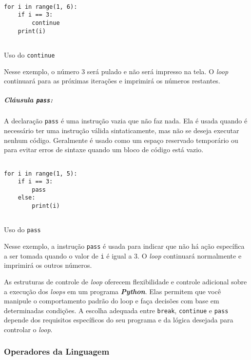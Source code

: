 \documentclass[a4paper, 12pt, onecolumn,singlespacing]{article}
\begin{document}
\begin{listing}[!ht]
	\begin{verbatim}
		
for i in range(1, 6):
	if i == 3:
		continue
	print(i)
	
	\end{verbatim}
	\label{clausula_continue}
	\caption{Uso do \texttt{continue}}
\end{listing}

Nesse exemplo, o número 3 será pulado e não será impresso na tela. O \textit{loop} continuará para as próximas iterações e imprimirá os números restantes.

	\subparagraph{Cláusula \texttt{pass}:}A declaração \texttt{pass} é uma instrução vazia que não faz nada. Ela é usada quando é necessário ter uma instrução válida sintaticamente, mas não se deseja executar nenhum código. Geralmente é usado como um espaço reservado temporário ou para evitar erros de sintaxe quando um bloco de código está vazio.
	
\begin{listing}[!ht]
	\begin{verbatim}
		
for i in range(1, 5):
	if i == 3:
		pass
	else:
		print(i)
	
	\end{verbatim}
	\label{clausula_pass}
	\caption{Uso do \texttt{pass}}
\end{listing}

Nesse exemplo, a instrução \texttt{pass} é usada para indicar que não há ação específica a ser tomada quando o valor de \texttt{i} é igual a 3. O \textit{loop} continuará normalmente e imprimirá os outros números.

As estruturas de controle de \textit{loop} oferecem flexibilidade e controle adicional sobre a execução dos \textit{loops} em um programa \textbf{\textit{Python}}. Elas permitem que você manipule o comportamento padrão do loop e faça decisões com base em determinadas condições. A escolha adequada entre \texttt{break}, \texttt{continue} e \texttt{pass} depende dos requisitos específicos do seu programa e da lógica desejada para controlar o \textit{loop}.
	
	\subsubsection{Operadores da Linguagem}
	
\end{document}
